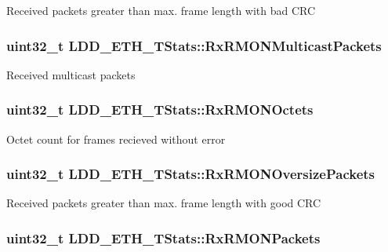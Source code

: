 Received packets greater than max. frame length with bad C\-R\-C \hypertarget{struct_l_d_d___e_t_h___t_stats_af8e69e6d131b75b281afadb70aabfa7f}{
\subsubsection[{Rx\-R\-M\-O\-N\-Multicast\-Packets}]{\setlength{\rightskip}{0pt plus 5cm}uint32\-\_\-t L\-D\-D\-\_\-\-E\-T\-H\-\_\-\-T\-Stats\-::\-Rx\-R\-M\-O\-N\-Multicast\-Packets}}\label{struct_l_d_d___e_t_h___t_stats_af8e69e6d131b75b281afadb70aabfa7f}
Received multicast packets \hypertarget{struct_l_d_d___e_t_h___t_stats_a15f672d05ff44d0b6d7cc630c2ce60c9}{
\subsubsection[{Rx\-R\-M\-O\-N\-Octets}]{\setlength{\rightskip}{0pt plus 5cm}uint32\-\_\-t L\-D\-D\-\_\-\-E\-T\-H\-\_\-\-T\-Stats\-::\-Rx\-R\-M\-O\-N\-Octets}}\label{struct_l_d_d___e_t_h___t_stats_a15f672d05ff44d0b6d7cc630c2ce60c9}
Octet count for frames recieved without error \hypertarget{struct_l_d_d___e_t_h___t_stats_ae88d2e9124e049f06f5f68ed30dfb69d}{
\subsubsection[{Rx\-R\-M\-O\-N\-Oversize\-Packets}]{\setlength{\rightskip}{0pt plus 5cm}uint32\-\_\-t L\-D\-D\-\_\-\-E\-T\-H\-\_\-\-T\-Stats\-::\-Rx\-R\-M\-O\-N\-Oversize\-Packets}}\label{struct_l_d_d___e_t_h___t_stats_ae88d2e9124e049f06f5f68ed30dfb69d}
Received packets greater than max. frame length with good C\-R\-C \hypertarget{struct_l_d_d___e_t_h___t_stats_a380d38b563e2f313a01ec34d60bfa8ed}{
\subsubsection[{Rx\-R\-M\-O\-N\-Packets}]{\setlength{\rightskip}{0pt plus 5cm}uint32\-\_\-t L\-D\-D\-\_\-\-E\-T\-H\-\_\-\-T\-Stats\-::\-Rx\-R\-M\-O\-N\-Packets}}\label{struct_l_d_d___e_t_h___t_stats_a380d38b563e2f313a01ec34d60bfa8ed}
